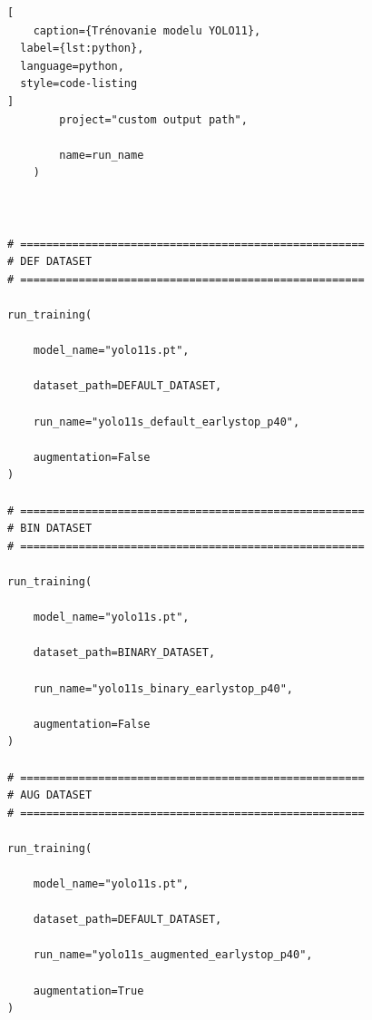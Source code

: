 \begin{lstlisting}[
    caption={Trénovanie modelu YOLO11},
  label={lst:python},
  language=python,
  style=code-listing
]
        project="custom output path",

        name=run_name
    )



# =====================================================
# DEF DATASET
# =====================================================

run_training(

    model_name="yolo11s.pt",

    dataset_path=DEFAULT_DATASET,

    run_name="yolo11s_default_earlystop_p40",

    augmentation=False
)

# =====================================================
# BIN DATASET
# =====================================================

run_training(

    model_name="yolo11s.pt",

    dataset_path=BINARY_DATASET,

    run_name="yolo11s_binary_earlystop_p40",

    augmentation=False
)

# =====================================================
# AUG DATASET
# =====================================================

run_training(

    model_name="yolo11s.pt",

    dataset_path=DEFAULT_DATASET,

    run_name="yolo11s_augmented_earlystop_p40",

    augmentation=True
)

\end{lstlisting}

